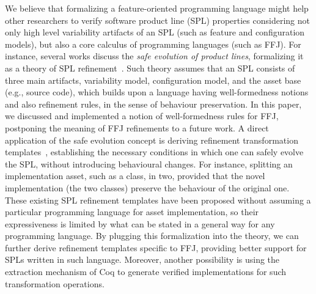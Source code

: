 We believe that formalizing a feature-oriented programming language might 
help other researchers to verify software product 
line (SPL) properties considering not only high level 
variability artifacts of an SPL (such as feature and configuration 
models), but also a core calculus of programming 
languages (such as \ac{FFJ}). 
For instance, several works discuss the \emph{safe evolution 
of product lines}, formalizing it as a theory of SPL refinement~\cite{theory-pl-refinement, partially-safe-evolution-pl}. 
Such theory assumes that an SPL consists of three main artifacts, variability model, configuration model, and the asset base (e.g., source code), which builds upon a language having well-formedness notions and also refinement rules, in the sense of behaviour preservation. 
In this paper, we discussed and implemented a notion of well-formedness rules for \ac{FFJ}, postponing 
the meaning of \ac{FFJ} refinements to a future work. 
A direct application of the safe evolution concept is deriving 
refinement transformation templates~\cite{safe-evolution-templates-pl}, 
establishing the necessary conditions in which one can safely evolve the SPL, 
without introducing behavioural changes. For instance, splitting an implementation asset, such as a class, in two, provided that the novel implementation (the two classes) preserve the behaviour of the original one. 
These existing SPL refinement templates have been proposed without assuming a particular 
programming language for asset implementation, so their expressiveness is limited by what can be stated 
in a general way for any programming language. 
By plugging this formalization into the theory, we can further derive refinement templates specific to \ac{FFJ}, 
providing better support for SPLs written in such language. Moreover, another possibility is using the extraction mechanism of Coq to generate verified implementations for such transformation operations.


